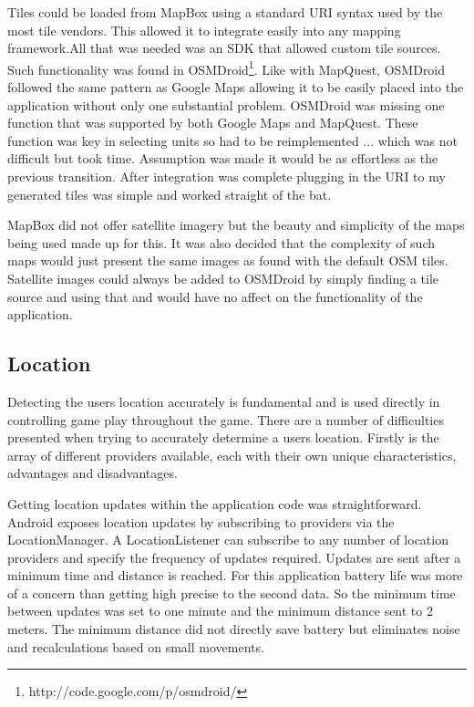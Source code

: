 Tiles could be loaded from MapBox using a standard URI syntax used by the most tile vendors. This allowed it to integrate easily into any mapping framework.All that was needed was an SDK that allowed custom tile sources. Such functionality was found in OSMDroid\footnote{http://code.google.com/p/osmdroid/}. Like with MapQuest, OSMDroid followed the same pattern as Google Maps allowing it to be easily placed into the application without only one substantial problem. OSMDroid was missing one function that was supported by both Google Maps and MapQuest. These function was key in selecting units so had to be reimplemented ... which was not difficult but took time. Assumption was made it would be as effortless as the previous transition. After integration was complete plugging in the URI to my generated tiles was simple and worked straight of the bat.

MapBox did not offer satellite imagery but the beauty and simplicity of the maps being used made up for this. It was also decided that the complexity of such maps would just present the same images as found with the default OSM tiles. Satellite images could always be added to OSMDroid by simply finding a tile source and using that and would have no affect on the functionality of the application. 


\subsection{Location}
Detecting the users location accurately is fundamental and is used directly in controlling game play throughout the game. There are a number of difficulties presented when trying to accurately determine a users location. Firstly is the array of different providers available, each with their own unique characteristics, advantages and disadvantages.

Getting location updates within the application code was straightforward. Android exposes location updates by subscribing to providers via the LocationManager. A LocationListener can subscribe to any number of location providers and specify the frequency of updates required. Updates are sent after a minimum time and distance is reached. For this application battery life was more of a concern than getting high precise to the second data. So the minimum time between updates was set to one minute and the minimum distance sent to 2 meters. The minimum distance did not directly save battery but eliminates noise and recalculations based on small movements.

